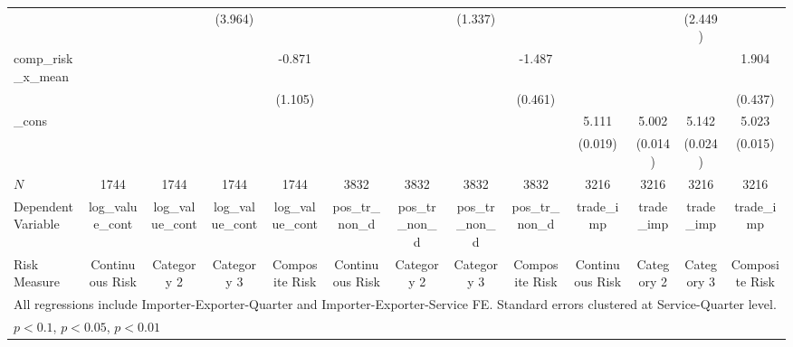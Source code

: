 \begin{table}[htbp]
\begin{tabular}{l*{12}{c}}
            &                     &                     &     (3.964)         &                     &                     &                     &     (1.337)         &                     &                     &                     &     (2.449)         &                     \\
[1em]
comp\_risk\_x\_mean&                     &                     &                     &      -0.871         &                     &                     &                     &      -1.487\sym{***}&                     &                     &                     &       1.904\sym{***}\\
            &                     &                     &                     &     (1.105)         &                     &                     &                     &     (0.461)         &                     &                     &                     &     (0.437)         \\
[1em]
\_cons      &                     &                     &                     &                     &                     &                     &                     &                     &       5.111\sym{***}&       5.002\sym{***}&       5.142\sym{***}&       5.023\sym{***}\\
            &                     &                     &                     &                     &                     &                     &                     &                     &     (0.019)         &     (0.014)         &     (0.024)         &     (0.015)         \\
\hline
\(N\)       &        1744         &        1744         &        1744         &        1744         &        3832         &        3832         &        3832         &        3832         &        3216         &        3216         &        3216         &        3216         \\
Dependent Variable&log\_value\_cont         &log\_value\_cont         &log\_value\_cont         &log\_value\_cont         &pos\_tr\_non\_d         &pos\_tr\_non\_d         &pos\_tr\_non\_d         &pos\_tr\_non\_d         &   trade\_imp         &   trade\_imp         &   trade\_imp         &   trade\_imp         \\
Risk Measure&Continuous Risk         &  Category 2         &  Category 3         &Composite Risk         &Continuous Risk         &  Category 2         &  Category 3         &Composite Risk         &Continuous Risk         &  Category 2         &  Category 3         &Composite Risk         \\
\hline\hline
\multicolumn{13}{l}{\footnotesize All regressions include Importer-Exporter-Quarter and Importer-Exporter-Service FE. Standard errors clustered at Service-Quarter level.}\\
\multicolumn{13}{l}{\footnotesize \sym{*} \(p<0.1\), \sym{**} \(p<0.05\), \sym{***} \(p<0.01\)}\\
\end{tabular}
\end{table}
